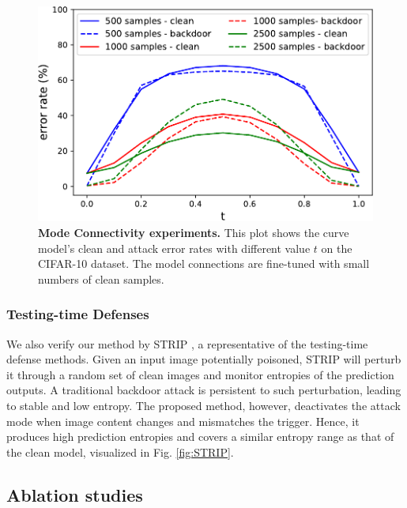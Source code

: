 \begin{center}
    \begin{figure}[h]
    \begin{center}
     \includegraphics[scale=0.502]{figures/mode_connectivity.pdf}
    \end{center}
    \vspace{-1mm}
    
    \caption{\textbf{Mode Connectivity experiments.} This plot shows the curve model's clean and attack error rates with different value $t$ on the CIFAR-10 dataset. The model connections are fine-tuned with small numbers of clean samples.}
    \label{fig:mode connectivity}
    \end{figure}
    \vspace{-4mm}
\end{center}


\subsubsection{Testing-time Defenses}
We also verify our method by STRIP \cite{gao2019strip}, a representative of the testing-time defense methods. Given an input image potentially poisoned, STRIP will perturb it through a random set of clean images and monitor entropies of the prediction outputs. A traditional backdoor attack is persistent to such perturbation, leading to stable and low entropy. The proposed method, however, deactivates the attack mode when image content changes and mismatches the trigger. Hence, it produces high prediction entropies and covers a similar entropy range as that of the clean model, visualized in Fig. \ref{fig:STRIP}.

\subsection{Ablation studies}
